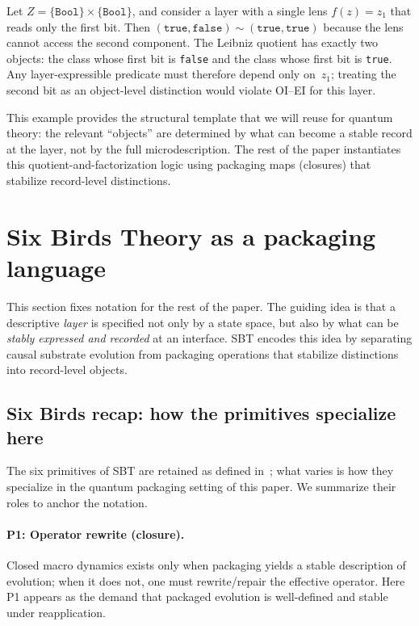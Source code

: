 \documentclass[11pt]{article}
\begin{document}
Let $Z=\{\texttt{Bool}\}\times\{\texttt{Bool}\}$, and consider a layer with a single lens $f(z)=z_1$ that reads only the first bit. Then $(\texttt{true},\texttt{false})\sim(\texttt{true},\texttt{true})$ because the lens cannot access the second component. The Leibniz quotient has exactly two objects: the class whose first bit is \texttt{false} and the class whose first bit is \texttt{true}. Any layer-expressible predicate must therefore depend only on~$z_1$; treating the second bit as an object-level distinction would violate OI--EI for this layer.

This example provides the structural template that we will reuse for quantum theory: the relevant ``objects'' are determined by what can become a stable record at the layer, not by the full microdescription. The rest of the paper instantiates this quotient-and-factorization logic using packaging maps (closures) that stabilize record-level distinctions.
 \section{Six Birds Theory as a packaging language}\label{sec:sbt}

This section fixes notation for the rest of the paper. The guiding idea is that
a descriptive \emph{layer} is specified not only by a state space, but also by what can be \emph{stably expressed and recorded} at an interface.
SBT encodes this idea by separating causal substrate evolution from packaging operations that stabilize distinctions into record-level objects.\cite{Tsiokos2026SixBirds}

\subsection{Six Birds recap: how the primitives specialize here}

The six primitives of SBT are retained as defined in~\cite{Tsiokos2026SixBirds}; what varies is how they specialize in the quantum packaging setting of this paper. We summarize their roles to anchor the notation.

\paragraph{P1: Operator rewrite (closure).}
Closed macro dynamics exists only when packaging yields a stable description of evolution; when it does not, one must rewrite/repair the effective operator. Here P1 appears as the demand that packaged evolution is well-defined and stable under reapplication.
\end{document}
